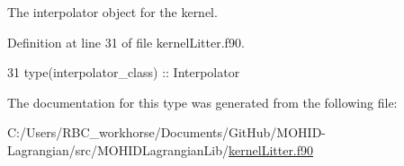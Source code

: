 The interpolator object for the kernel. 



Definition at line 31 of file kernel\+Litter.\+f90.


\begin{DoxyCode}
31         \textcolor{keywordtype}{type}(interpolator\_class) :: Interpolator
\end{DoxyCode}


The documentation for this type was generated from the following file\+:\begin{DoxyCompactItemize}
\item 
C\+:/\+Users/\+R\+B\+C\+\_\+workhorse/\+Documents/\+Git\+Hub/\+M\+O\+H\+I\+D-\/\+Lagrangian/src/\+M\+O\+H\+I\+D\+Lagrangian\+Lib/\mbox{\hyperlink{kernel_litter_8f90}{kernel\+Litter.\+f90}}\end{DoxyCompactItemize}
